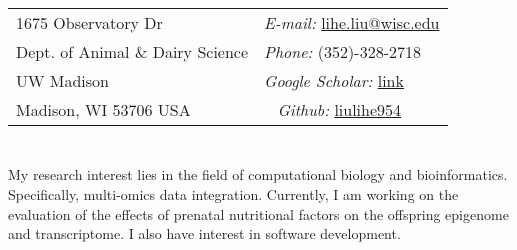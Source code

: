 \documentclass[margin,line,10pt]{res}
\begin{document}

\begin{resume}

\section{}
\vspace{.05in}
\begin{tabular}{@{}p{2in}p{5in}}
1675 Observatory Dr  & \hspace{2.5cm} {\it E-mail:}  \href{mailto:lihe.liu@wisc.edu}{lihe.liu@wisc.edu} \\       
Dept. of Animal \& Dairy Science  & \hspace{2.5cm} {\it Phone:} (352)-328-2718\\     
UW Madison  & \hspace{2.45cm} {\it Google Scholar:} \textcolor{blue}{\href{https://scholar.google.com/citations?user=48N2nbYAAAAJ&hl=en}{link}}\\
Madison, WI 53706 USA  & \ \hspace{2.35cm} {\it Github:} \textcolor{blue}{\href{https://github.com/liulihe954}{liulihe954}}\\
\end{tabular}

\vspace{0.1cm}

\section{}

My research interest lies in the field of computational biology and bioinformatics. Specifically, multi-omics data integration. Currently, I am working on the evaluation of the effects of prenatal nutritional factors on the offspring epigenome and transcriptome. I also have interest in software development.

\vspace{0.1cm}

\section{}


\end{resume}
\end{document}
